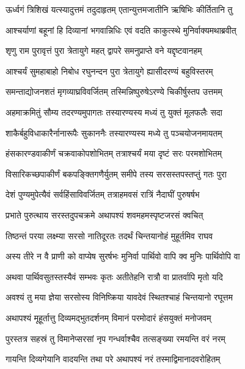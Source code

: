 \twolineshloka
{ऊर्ध्वगं त्रिशिखं यत्स्यादुत्तमं तदुदाहृतम्}
{एतान्युत्तमजातीनि ऋषिभिः कीर्तितानि तु}%

\twolineshloka
{आश्चर्याणां बहूनां हि दिव्यानां भगवान्निधिः}
{एवं वदति काकुत्स्थे मुनिर्वाक्यमथाब्रवीत्}%


\twolineshloka
{शृणु राम पुरावृत्तं पुरा त्रेतायुगे महत्}
{द्वापरे समनुप्राप्ते वने यद्दृष्टवानहम्}%

\twolineshloka
{आश्चर्यं सुमहाबाहो निबोध रघुनन्दन}
{पुरा त्रेतायुगे ह्यासीदरण्यं बहुविस्तरम्}%

\twolineshloka
{समन्ताद्योजनशतं मृगव्याघ्रविवर्जितम्}
{तस्मिन्निष्पुरुषेऽरण्ये चिकीर्षुस्तप उत्तमम्}%

\twolineshloka
{अहमाक्रमितुं सौम्य तदरण्यमुपागतः}
{तस्यारण्यस्य मध्यं तु युक्तं मूलफलैः सदा}%

\twolineshloka
{शाकैर्बहुविधाकारैर्नानारूपैः सुकाननैः}
{तस्यारण्यस्य मध्ये तु पञ्चयोजनमायतम्}%

\twolineshloka
{हंसकारण्डवाकीर्णं चक्रवाकोपशोभितम्}
{तत्राश्चर्यं मया दृष्टं सरः परमशोभितम्}%

\twolineshloka
{विसारिकच्छपाकीर्णं बकपङ्क्तिगणैर्युतम्}
{समीपे तस्य सरसस्तपस्तप्तुं गतः पुरा}%

\twolineshloka
{देशं पुण्यमुपेत्यैवं सर्वहिंसाविवर्जितम्}
{तत्राहमवसं रात्रिं नैदाघीं पुरुषर्षभ}%

\twolineshloka
{प्रभाते पुरुत्थाय सरस्तदुपचक्रमे}
{अथापश्यं शवमहमस्पृष्टजरसं क्वचित्}%

\twolineshloka
{तिष्ठन्तं परया लक्ष्म्या सरसो नातिदूरतः}
{तदर्थं चिन्तयानोहं मुहूर्तमिव राघव}%

\twolineshloka
{अस्य तीरे न वै प्राणी को वाप्येष सुरर्षभः}
{मुनिर्वा पार्थिवो वापि क्व मुनिः पार्थिवोपि वा}%

\twolineshloka
{अथवा पार्थिवसुतस्तस्यैवं सम्भवः कृतः}
{अतीतेहनि रात्रौ वा प्रातर्वापि मृतो यदि}%

\twolineshloka
{अवश्यं तु मया ज्ञेया सरसोस्य विनिष्क्रिया}
{यावदेवं स्थितश्चाहं चिन्तयानो रघूत्तम}%

\twolineshloka
{अथापश्यं मूहूर्तात्तु दिव्यमद्भुतदर्शनम्}
{विमानं परमोदारं हंसयुक्तं मनोजवम्}%

\twolineshloka
{पुरस्तत्र सहस्रं तु विमानेप्सरसां नृप}
{गन्धर्वाश्चैव तत्सङ्ख्या रमयन्ति वरं नरम्}%

\twolineshloka
{गायन्ति दिव्यगेयानि वादयन्ति तथा परे}
{अथापश्यं नरं तस्माद्विमानादवरोहितम्}%

